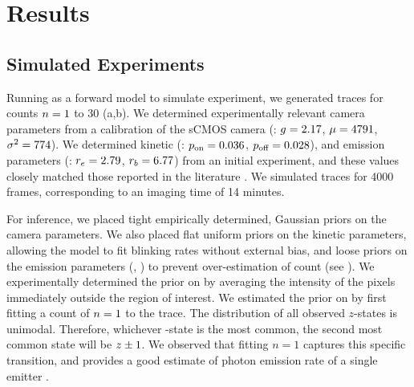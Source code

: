 




\section{Results}

\subsection{Simulated Experiments}
Running \ours as a forward model to simulate experiment, 
we generated traces for counts $n=1$ to 30 (a,b).
	We determined experimentally relevant camera parameters from a calibration of the
	sCMOS camera (\parametersc: $g=2.17$, $\mu=4791$, $\sigma^2=774$). 
	We determined kinetic (\parameterst: $p_\text{on}=0.036$, $p_\text{off}=0.028$), and emission parameters 
	(\parameterse: $r_e=2.79$, $r_b=6.77$) from an initial experiment, 
	and these values closely matched those reported in the literature \cite{stein_2021}.
	We simulated traces for 4000 frames, corresponding to an imaging time of 14 minutes.

For inference, we placed tight empirically determined, Gaussian priors on 
the camera parameters.
	We also placed flat uniform priors on the kinetic parameters, allowing the model 
	to fit blinking rates without external bias,
	and loose priors on the emission parameters (\rb, \re) to prevent 
	over-estimation of count (see ). 
	We experimentally determined the prior on \rb by averaging the 
	intensity of the pixels immediately outside the region of interest.
	We estimated the prior on \re  by first fitting a count of $n=1$ to the trace.
	The distribution of all observed $z$-states is unimodal.
	Therefore, whichever \z{}-state is the most common, the second most common state 
	will be $z_{} \pm 1$. 
	We observed that fitting $n=1$ captures this specific transition, and provides a good
	estimate of photon emission rate of a single emitter \re.
	
